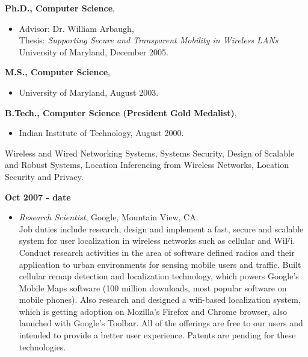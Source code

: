 

\begin{resume}

{\bf Ph.D., Computer Science},
    \begin{itemize}
         \item[] Advisor: Dr. William Arbaugh, \\
		 Thesis: {\em Supporting Secure and Transparent Mobility in Wireless LANs} \\
                 University of Maryland, December 2005.
    \end{itemize}

{\bf M.S., Computer Science},   	
    \begin{itemize}
         \item[] University of Maryland, August 2003.
    \end{itemize}

{\bf B.Tech., Computer Science (President Gold Medalist)},
    \begin{itemize}
          \item[] Indian Institute of Technology, August 2000.
    \end{itemize}

 
Wireless and Wired Networking Systems, Systems Security, Design of Scalable and Robust
Systems, Location Inferencing from Wireless Networks, Location Security and Privacy.


{\bf Oct 2007 - date}
    \begin{itemize}
         \item[] {\it Research Scientist}, Google, Mountain View, CA.\\
	 Job duties include research, design and implement a fast, secure and
	 scalable system for user localization in wireless networks such as cellular and WiFi.
	 Conduct research activities in the area of software defined radios and
	 their application to urban environments for sensing mobile users and 
	 traffic. Built cellular remap detection and localization technology, which
	 powers Google's Mobile Maps software (100 million downloads, most popular
	 software on mobile phones). Also research and designed a wifi-based localization system,
	 which is getting adoption on Mozilla's Firefox and Chrome browser, also 
	 launched with Google's Toolbar. All of the offerings are free to our users and
	 intended to provide a better user experience. Patents are pending for these
	 technologies.


\end{itemize}
\end{resume}
